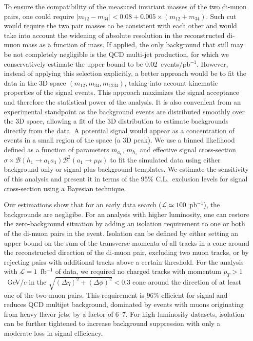 \documentclass[aps,prl,twocolumn,nofootinbib,superscriptaddress]{revtex4}
\begin{document}
To ensure the compatibility of the measured invariant masses of the
two di-muon pairs, one could require $|m_{12} - m_{34}| < 0.08 +
0.005\times(m_{12} + m_{34})$. Such cut would require the two pair
masses to be consistent with each other and would take into account
the widening of absolute resolution in the reconstructed di-muon mass
as a function of mass.  If applied, the only background that still may
be not completely negligible is the QCD multi-jet production, for
which we conservatively estimate the upper bound to be
0.02~events/pb$^{-1}$.  However, instead of applying this selection
explicitly, a better approach would be to fit the data in the 3D space
$(m_{12}, m_{34}, m_{1234})$, taking into account kinematic properties
of the signal events.  This approach maximizes the signal acceptance
and therefore the statistical power of the analysis.  It is also
convenient from an experimental standpoint as the background events
are distributed smoothly over the 3D space, allowing a fit of the 3D
distribution to estimate backgrounds directly from the data.  A
potential signal would appear as a concentration of events in a small
region of the space (a 3D peak). We use a binned likelihood defined as
a function of parameters $m_{a_1}$, $m_{h_1}$ and effective signal
cross-section $\sigma \times \mathcal{B} (h_1 \to a_1 a_1)
\mathcal{B}^2(a_1 \to \mu\mu)$ to fit the simulated data using either
background-only or signal-plus-background templates.  We estimate the
sensitivity of this analysis and present it in terms of the 95\%
C.L.\ exclusion levels for signal cross-section using a Bayesian
technique.

Our estimations show that for an early data search ($\mathcal{L}
\simeq 100$~pb$^{-1}$), the backgrounds are negligibe.  For an
analysis with higher luminosity, one can restore the zero-background
situation by adding an isolation requirement to one or both of the
di-muon pairs in the event.  Isolation can be defined by either
setting an upper bound on the sum of the transverse momenta of all
tracks in a cone around the reconstructed direction of the di-muon
pair, excluding two muon tracks, or by rejecting pairs with additional
tracks above a certain threshold.  For the analysis with $\mathcal{L}
= 1$~fb$^{-1}$ of data, we required no charged tracks with momentum
$p_T > 1$~GeV/$c$ in the $\sqrt{(\Delta \eta)^2 + (\Delta \phi)^2} <
0.3$ cone around the direction of at least one of the two muon pairs.
This requirement is 96\% efficient for signal and reduces QCD multijet
background, dominated by events with muons originating from heavy
flavor jets, by a factor of 6--7.  For high-luminosity datasets,
isolation can be further tightened to increase background suppression
with only a moderate loss in signal efficiency.
\end{document}
